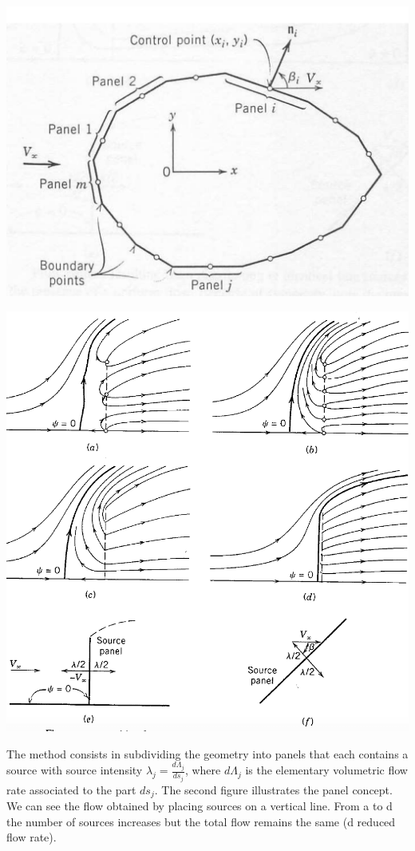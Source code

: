 	\begin{center}
	\begin{minipage}{0.4\textwidth}
	\includegraphics[scale=0.15]{ch2/39}
	\end{minipage}
	\begin{minipage}{0.4\textwidth}
	\includegraphics[scale=0.15]{ch2/40}
	\end{minipage}
	\end{center}
	The method consists in subdividing the geometry into panels that each contains a source with source intensity $\lambda _j =\frac{d\Lambda _j}{ds_j}$, where $d\Lambda _j$ is the elementary volumetric flow rate associated to the part $ds_j$. The second figure illustrates the panel concept. We can see the flow obtained by placing sources on a vertical line. From a to d the number of sources increases but the total flow remains the same (d reduced flow rate). \\
	
